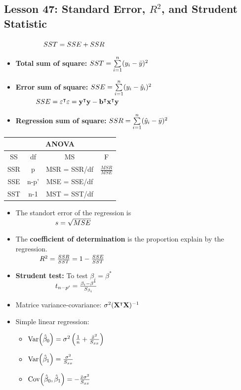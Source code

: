 \documentclass[10pt, french]{article}
\begin{document}
\begin{multicols*}{3}
\section*{Lesson 47: Standard Error, $R^2$, and Strudent Statistic}
$\hspace*{2cm} SST = SSE + SSR$
\begin{itemize}[align=left,leftmargin=*]
  \item \textbf{Total sum of square:} $SST = \sum\limits_{i=1}^n (y_i - \bar{y})^2$
  \item \textbf{Error sum of square:} $SSE = \sum\limits_{i=1}^n (y_i - \hat{y}_i)^2$ \\
  $\hspace*{1cm} SSE = \mathbf{\varepsilon^\intercal\varepsilon} = \mathbf{y}^\intercal\mathbf{y} - \mathbf{b}^\intercal\mathbf{x}^\intercal\mathbf{y} $
  \item \textbf{Regression sum of square:} $SSR = \sum\limits_{i=1}^n (\hat{y}_i - \bar{y})^2$
\end{itemize}
\begin{center}
  \begin{tabular}{cccc}
    \hline
    \multicolumn{4}{c}{ANOVA} \\
    \hline
    SS & df & MS & F \\
    \hline
    SSR & p & MSR = SSR/df & $\frac{MSR}{MSE}$\\
    SSE & n-p' & MSE = SSE/df &\\
    SST & n-1 & MST = SST/df &\\
    \hline
  \end{tabular}
\end{center}
\begin{itemize}[align=left,leftmargin=*]
  \item The standort error of the regression is \\
  $\hspace*{2cm}  s=\sqrt{MSE}$
  \item The \textbf{coefficient of determination} is the proportion explain by the regression. \\
  $\hspace*{1.2cm} R^2 = \frac{SSR}{SST} = 1 - \frac{SSE}{SST}$
  \item \textbf{Strudent test:} To test $\beta_i = \beta^*$\\
  $\hspace*{2cm} t_{n-p'} = \frac{\beta_i - \beta^*}{S_{\beta_i}}$
  \item[] Matrice variance-covariance: $\sigma^2(\mathbf{X}^\intercal\mathbf{X})^{-1}$
  \item Simple linear regression:
  \begin{itemize}
    \item $\mathrm{Var} {\left( \hat{\beta}_0 \right)} = \sigma^2 \left(\frac{1}{n} + \frac{\bar{x}^2}{S_{xx}} \right)$
    \item $\mathrm{Var} {\left( \hat{\beta}_1 \right)} = \frac{\sigma^2}{S_{xx}}$
    \item $\mathrm{Cov} {\left( \hat{\beta}_0, \hat{\beta}_1 \right)} = -\frac{\bar{x}\sigma^2}{S_{xx}}$
  \end{itemize}
\end{itemize}
\columnbreak


\end{multicols*}
\end{document}
